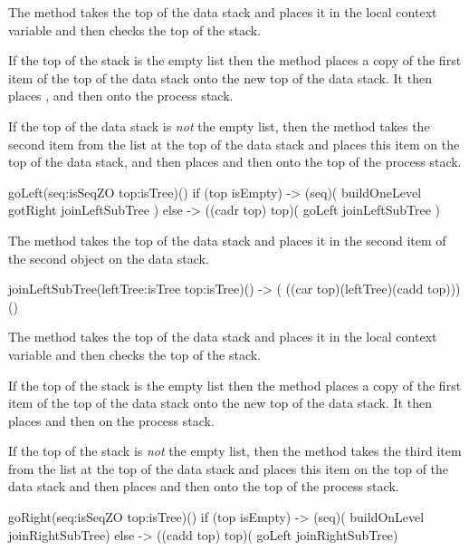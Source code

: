 \item The  method takes the top of the data stack and places 
it in the  local context variable and then checks the top of the 
stack. 

If the top of the stack is the empty list then the  method 
places a copy of the first item of the top of the data stack onto the new 
top of the data stack. It then places ,  
and then  onto the process stack. 

If the top of the data stack is \emph{not} the empty list, then the 
 method takes the second item from the list at the top of the 
data stack and places this item on the top of the data stack, and then 
places  and then  onto the top of the 
process stack. 

\starttyping
\startJoylolCode
goLeft(seq:isSeqZO top:isTree)() {
  if (top isEmpty) {
    -> (seq)( buildOneLevel gotRight joinLeftSubTree )
  } else {
    -> ((cadr top) top)( goLeft joinLeftSubTree )
  }
}
\stopJoylolCode
\stoptyping

\item The  method takes the top of the data stack 
and places it in the second item of the second object on the data stack. 

\starttyping
\startJoylolCode
joinLeftSubTree(leftTree:isTree top:isTree)()
-> ( ((car top)(leftTree)(cadd top)))()
\stopJoylolCode
\stoptyping

\item The  method takes the top of the data stack and places 
it in the  local context variable and then checks the top of the 
stack. 

If the top of the stack is the empty list then the  method 
places a copy of the first item of the top of the data stack onto the new 
top of the data stack. It then places  and then 
 on the process stack. 

If the top of the stack is \emph{not} the empty list, then the 
 method takes the third item from the list at the top of the 
data stack and places this item on the top of the data stack and then 
places  and then  onto the top of the 
process stack. 

\starttyping
\startJoylolCode
goRight(seq:isSeqZO top:isTree)() {
  if (top isEmpty) {
    -> (seq)( buildOnLevel joinRightSubTree)
  } else {
    -> ((cadd top) top)( goLeft joinRightSubTree)
  }
}
\stopJoylolCode
\stoptyping

